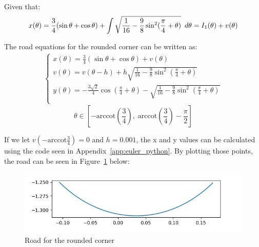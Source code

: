\documentclass[12pt]{article}
\newcommand{\Hquad}{\hspace{0.5em}}
\begin{document}

 
        Given that:
        \begin{equation}
            x(\theta) = \frac{3}{4} (\sin\theta + \cos\theta) + \int \sqrt{\frac{1}{16} - \frac{9}{8} \sin^2 (\frac{\pi}{4}+\theta)} \Hquad d\theta = I_1(\theta) + v(\theta)
        \end{equation}

        The road equations for the rounded corner can be written as:
        \begin{align}            
            \begin{cases}
            x(\theta) = \frac{3}{4} (\sin\theta + \cos\theta) + v(\theta) \\ %
            v(\theta) = v(\theta-h) + h \sqrt{\frac{1}{16} - \frac{9}{8} \sin^2 (\frac{\pi}{4}+\theta)} \\
            y(\theta) = - \frac{3\sqrt{2}}{4} \cos (\frac{\pi}{4} + \theta) - \sqrt{\frac{1}{16} - \frac{9}{8} \sin^2 (\frac{\pi}{4}+\theta)} \\
        \end{cases}
        \end{align}
        \[ \theta \in [- \text{arccot}(\frac{3}{4}), \;\text{arccot}(\frac{3}{4}) - \frac{\pi}{2}] \]

        If we let $v(-\text{arccot}\frac{3}{4}) = 0$ and $h=0.001$, the x and y values can be calculated using the code seen in Appendix~\ref{app:euler_python}. By plotting those points, the road can be seen in Figure~\ref{fig:corner_road} below:
        \begin{figure}[H]
            \includegraphics[width=\linewidth]{images/corner_road.png}
            \caption{Road for the rounded corner}\label{fig:corner_road}
        \end{figure}
\end{document}
